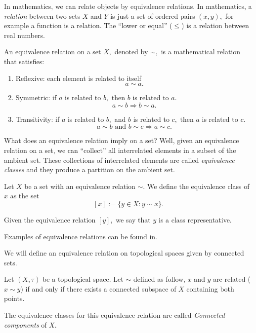 \documentclass[
	fontsize=10pt, %
	twoside=false, %
	secnumdepth=1, %
]{kaobook}
\begin{document}
In mathematics, we can relate objects by equivalence relations. In mathematics, a \emph{relation} between two sets $X$ and $Y$ is just a set of ordered pairs $(x,y),$ for example a function is a relation. The ``lower or equal'' ($\leq$) is a relation between real numbers.

\begin{definition}
An equivalence relation on a set $X,$ denoted by $\sim,$ is a mathematical relation that satisfies:
\begin{enumerate}
\item Reflexive: each element is related to itself $$a\sim a.$$

\item Symmetric: if $a$ is related to $b,$ then $b$ is related to $a.$ $$a\sim b\Rightarrow b\sim a.$$

\item Transitivity: if $a$ is related to $b,$ and $b$ is related to $c,$ then $a$ is related to $c.$ $$a\sim b \mbox{ and }b\sim c\Rightarrow a\sim c.$$
\end{enumerate}
\end{definition}

What does an equivalence relation imply on a set? Well, given an equivalence relation on a set, we can ``collect'' all interrelated elements in a subset of the ambient set. These collections of interrelated elements are called \emph{equivalence classes} and they produce a partition on the ambient set.

 \begin{definition}
 Let $X$ be a set with an equivalence relation $\sim.$ We define the equivalence class of $x$ as the set $$[x]:=\{y\in X: y\sim x\}.$$
 
 Given the equivalence relation $[y],$ we say that $y$ is a class representative. 
 \end{definition}
 
 Examples of equivalence relations can be found in.
 
 We will define an equivalence relation on topological spaces given by connected sets.
 
 \begin{definition}
 Let $(X,\tau)$ be a topological space. Let $\sim$ defined as follow, $x$ and $y$ are related ($x\sim y$) if and only if there exists a connected subspace of $X$ containing both points. 
 
 The equivalence classes for this equivalence relation are called \emph{Connected components} of $X.$
 \end{definition}
 
\end{document}
